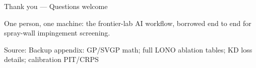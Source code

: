 \documentclass[aspectratio=169,11pt]{beamer}
\newcommand{\blue}[1]{\textcolor{aaltoBlue}{#1}}
\newcommand{\src}[1]{\vfill{\tiny\textcolor{gray!70!black}{Source: #1}}}
\begin{document}
\begin{frame}[c]{}
\centering
{\Huge \blue{Thank you --- Questions welcome}}
\bigskip\bigskip

\large One person, one machine: the frontier-lab AI workflow, borrowed end to end
for spray-wall impingement screening.

\bigskip\bigskip
\src{Backup appendix: GP/SVGP math; full LONO ablation tables; KD loss details; calibration PIT/CRPS}
\end{frame}
\end{document}
